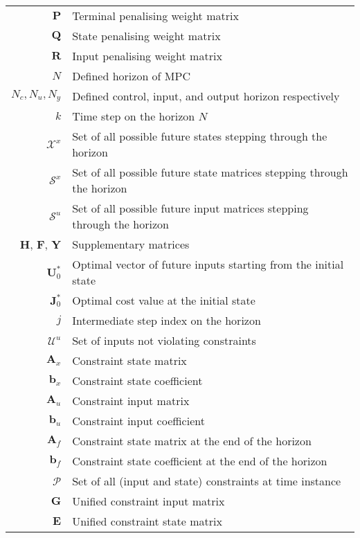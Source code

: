 \begin{scriptsize}
\begin{tabularx}{\textwidth}{r|X}
	$\textbf{P}$                    & Terminal penalising weight matrix\\
$\textbf{Q}$                    & State penalising weight matrix\\
$\textbf{R}$                    & Input penalising weight matrix\\

	$N$											& Defined horizon of MPC\\
	$N_c,N_u,N_y$											& Defined control, input, and output horizon respectively\\
	$k$																& Time step on the horizon $N$ \\

$\mathcal{X}^x$             & Set of all possible future states stepping through the horizon\\
$\mathcal{S}^x$             & Set of all possible future state matrices stepping through the horizon\\
$\mathcal{S}^u$             & Set of all possible future input matrices stepping through the horizon\\
$\textbf{H}$, $\textbf{F}$, $\textbf{Y}$ & Supplementary matrices\\
$\textbf{U}^*_0$            & Optimal vector of future inputs starting from the initial state\\
$\textbf{J}^*_0$            & Optimal cost value at the initial state\\
$j$                         & Intermediate step index on the horizon\\
$\mathcal{U}^u$             & Set of inputs not violating constraints\\
$\textbf{A}_x$              & Constraint state matrix\\
$\textbf{b}_x$              & Constraint state coefficient\\
$\textbf{A}_u$              & Constraint input matrix\\
$\textbf{b}_u$              & Constraint input coefficient\\
$\textbf{A}_f$              & Constraint state matrix at the end of the horizon\\
$\textbf{b}_f$              & Constraint state coefficient at the end of the horizon\\
$\mathcal{P}$               & Set of all (input and state) constraints at time instance\\
$\textbf{G}$                & Unified constraint input matrix \\
$\textbf{E}$                & Unified constraint state matrix \\

\end{tabularx}
\end{scriptsize}
